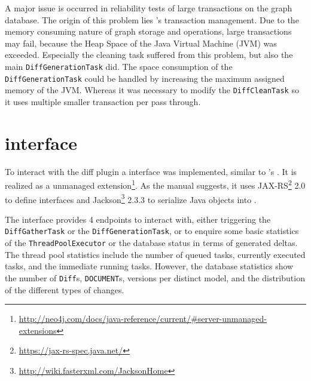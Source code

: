 	A major issue is occurred in reliability tests of large transactions on the graph database. The origin of this problem lies \neoj's transaction management. Due to the memory consuming nature of graph storage and operations, large transactions may fail, because the Heap Space of the Java Virtual Machine (JVM) was exceeded. Especially the cleaning task suffered from this problem, but also the main \texttt{DiffGenerationTask} did.
	The space consumption of the \texttt{DiffGenerationTask} could be handled by increasing the maximum assigned memory of the JVM. Whereas it was necessary to modify the \texttt{DiffCleanTask} so it uses multiple smaller transaction per pass through.
	
	\begin{comment}
	\begin{itemize}
		\item interaction with \bives and neo4j
		\item problems with Transaction rollback in actually successfull transactions
		\item trigger for generating diffs for new versions
	\end{itemize}
	\end{comment}

\section{\rest interface}
	\label{sec:impl:rest}
	
	To interact with the diff plugin a \rest interface was implemented, similar to \masymos's \morre. It is realized as a unmanaged \neoj extension\footnote{\url{http://neo4j.com/docs/java-reference/current/\#server-unmanaged-extensions}}. As the \neoj manual suggests, it uses JAX-RS\footnote{\url{https://jax-rs-spec.java.net/}} 2.0 to define interfaces and Jackson\footnote{\url{http://wiki.fasterxml.com/JacksonHome}} 2.3.3 to serialize Java objects into \json.
	
	The \rest interface provides 4 endpoints to interact with, either triggering the \texttt{DiffGatherTask} or the \texttt{DiffGenerationTask}, or to enquire some basic statistics of the \texttt{ThreadPoolExecutor} or the database status in terms of generated deltas.
	The thread pool statistics include the number of queued tasks, currently executed tasks, and the immediate running tasks.
	However, the database statistics show the number of \texttt{Diff}s, \texttt{DOCUMENT}s, versions per distinct model, and the distribution of the different types of changes.
	
	\begin{comment}
	\begin{itemize}
		\item \rest interface for requesting diffs
	\end{itemize}
	\end{comment}
